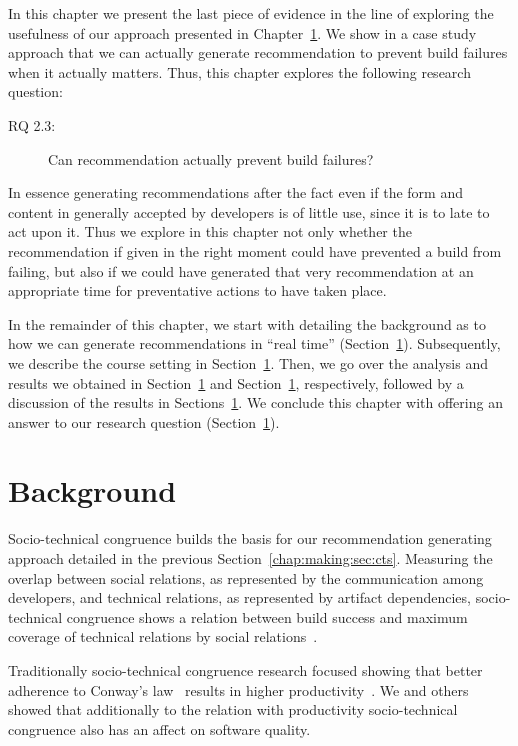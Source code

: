 \label{chap:actionable}
In this chapter we present the last piece of evidence in the line of exploring the usefulness of our approach presented in Chapter~\ref{}.
We show in a case study approach that we can actually generate recommendation to prevent build failures when it actually matters.
Thus, this chapter explores the following research question:

\begin{description}
  \item[RQ 2.3:] Can recommendation actually prevent build failures?
\end{description}

In essence generating recommendations after the fact even if the form and content in generally accepted by developers is of little use, since it is to late to act upon it.
Thus we explore in this chapter not only whether the recommendation if given in the right moment could have prevented a build from failing, but also if we could have generated that very recommendation at an appropriate time for preventative actions to have taken place.

In the remainder of this chapter, we start with detailing the background as to how we can generate recommendations in ``real time'' (Section~\ref{}).
Subsequently, we describe the course setting in Section~\ref{}.
Then, we go over the analysis and results we obtained in Section~\ref{} and Section~\ref{}, respectively, followed by a discussion of the results in Sections~\ref{}.
We conclude this chapter with offering an answer to our research question (Section~\ref{}).

\section{Background}
Socio-technical congruence builds the basis for our recommendation generating approach detailed in the previous Section~\ref{chap:making:sec:cts}.
Measuring the overlap between social relations, as represented by the communication among developers, and technical relations, as represented by artifact dependencies, socio-technical congruence shows a relation between build success and maximum coverage of technical relations by social relations~\cite{kwan:tse:2011}.

Traditionally socio-technical congruence research focused showing that better adherence to Conway's law~\cite{conway:datamination:1968} results in higher productivity~\cite{cataldo:cscw:2006}.
We and others showed that additionally to the relation with productivity socio-technical congruence also has an affect on software quality.  

